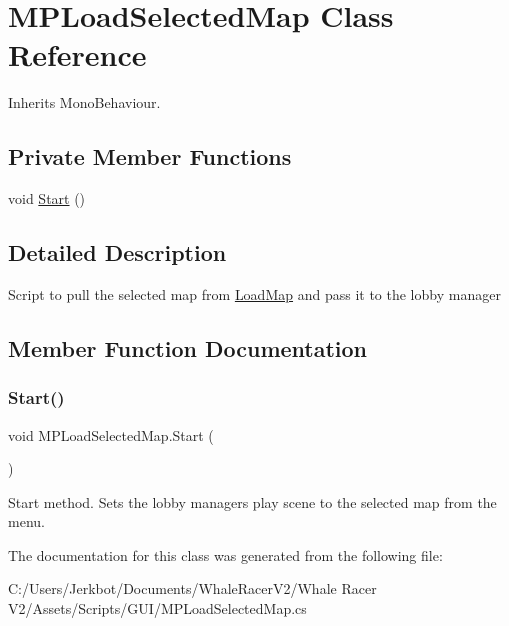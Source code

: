 \hypertarget{class_m_p_load_selected_map}{}\section{M\+P\+Load\+Selected\+Map Class Reference}
\label{class_m_p_load_selected_map}


Inherits Mono\+Behaviour.

\subsection*{Private Member Functions}
\begin{DoxyCompactItemize}
\item 
void \hyperlink{class_m_p_load_selected_map_a74f997041e39ba444a3b68a0b860c942}{Start} ()
\end{DoxyCompactItemize}


\subsection{Detailed Description}
Script to pull the selected map from \hyperlink{class_load_map}{Load\+Map} and pass it to the lobby manager 



\subsection{Member Function Documentation}
\mbox{\label{class_m_p_load_selected_map_a74f997041e39ba444a3b68a0b860c942}} 
\subsubsection{\texorpdfstring{Start()}{Start()}}
{\footnotesize\ttfamily void M\+P\+Load\+Selected\+Map.\+Start (\begin{DoxyParamCaption}{ }\end{DoxyParamCaption})\hspace{0.3cm}{\ttfamily [private]}}



Start method. Sets the lobby manager\textquotesingle{}s play scene to the selected map from the menu. 



The documentation for this class was generated from the following file\+:\begin{DoxyCompactItemize}
\item 
C\+:/\+Users/\+Jerkbot/\+Documents/\+Whale\+Racer\+V2/\+Whale Racer V2/\+Assets/\+Scripts/\+G\+U\+I/M\+P\+Load\+Selected\+Map.\+cs\end{DoxyCompactItemize}
